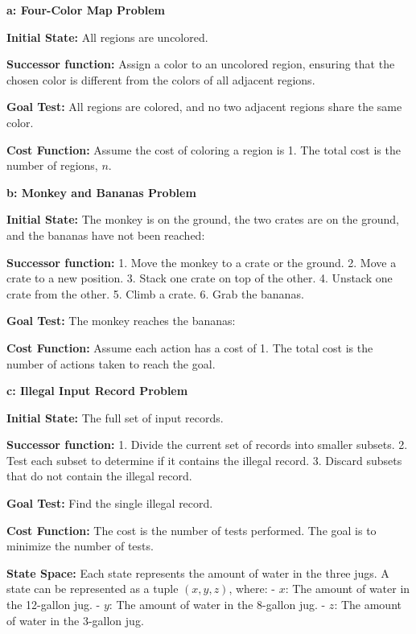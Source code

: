 \documentclass[cn,12pt]{homework}
\begin{document}
\begin{solution}
  \quad

  \textbf{a: Four-Color Map Problem}

  \textbf{Initial State:}  
  All regions are uncolored.

  \textbf{Successor function:}  
  Assign a color to an uncolored region, ensuring that the chosen color is different from the colors of all adjacent regions.

  \textbf{Goal Test:}  
  All regions are colored, and no two adjacent regions share the same color.

  \textbf{Cost Function:}  
  Assume the cost of coloring a region is 1. The total cost is the number of regions, \(n\).
  \newline

  \textbf{b: Monkey and Bananas Problem}

  \textbf{Initial State:}  
  The monkey is on the ground, the two crates are on the ground, and the bananas have not been reached:

  \textbf{Successor function:}  
  1. Move the monkey to a crate or the ground.
  2. Move a crate to a new position.
  3. Stack one crate on top of the other.
  4. Unstack one crate from the other.
  5. Climb a crate.
  6. Grab the bananas.

  \textbf{Goal Test:}  
  The monkey reaches the bananas:

  \textbf{Cost Function:}  
  Assume each action has a cost of 1. The total cost is the number of actions taken to reach the goal.
  \newline

  \textbf{c: Illegal Input Record Problem}

  \textbf{Initial State:}  
  The full set of input records.

  \textbf{Successor function:}  
  1. Divide the current set of records into smaller subsets.  
  2. Test each subset to determine if it contains the illegal record.  
  3. Discard subsets that do not contain the illegal record.

  \textbf{Goal Test:}  
  Find the single illegal record.

  \textbf{Cost Function:}  
  The cost is the number of tests performed. The goal is to minimize the number of tests.
  \newline

  \textbf{State Space:}  
  Each state represents the amount of water in the three jugs. A state can be represented as a tuple \((x, y, z)\), where:
  - \(x\): The amount of water in the 12-gallon jug.
  - \(y\): The amount of water in the 8-gallon jug.
  - \(z\): The amount of water in the 3-gallon jug.


\end{solution}
\end{document}
